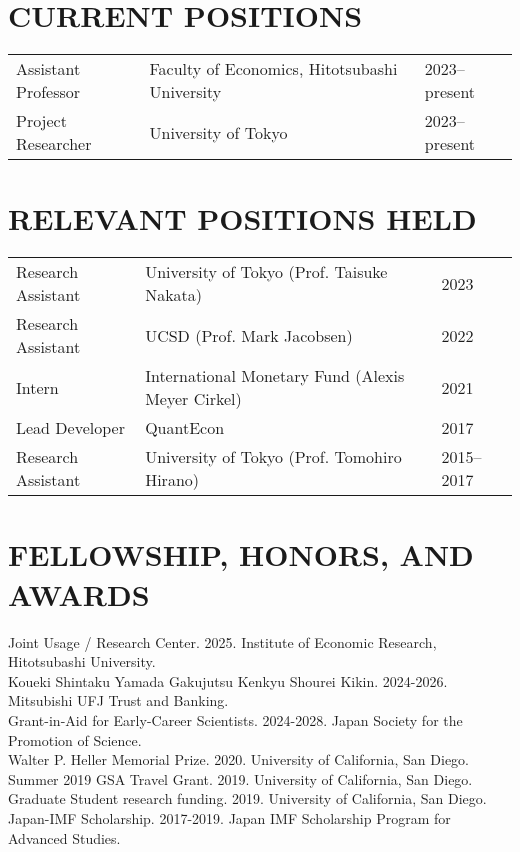 \documentclass[12pt]{article}
\begin{document}
\section*{CURRENT POSITIONS}
\begin{tabular}{@{}lll}
Assistant Professor &Faculty of Economics, Hitotsubashi University& 2023--present\\
Project Researcher &University of Tokyo& 2023--present
\end{tabular}

\section*{RELEVANT POSITIONS HELD}
\begin{tabular}{@{}lll}
Research Assistant &University of Tokyo (Prof. Taisuke Nakata)& 2023\\
Research Assistant &UCSD (Prof. Mark Jacobsen)& 2022\\
Intern &International Monetary Fund (Alexis Meyer Cirkel)& 2021\\
Lead Developer &QuantEcon& 2017\\
Research Assistant &University of Tokyo (Prof. Tomohiro Hirano)& 2015--2017
\end{tabular}

\section*{FELLOWSHIP, HONORS, AND AWARDS}
Joint Usage / Research Center. 2025. Institute of Economic Research, Hitotsubashi University.\\
Koueki Shintaku Yamada Gakujutsu Kenkyu Shourei Kikin. 2024-2026. Mitsubishi UFJ Trust and Banking.\\
Grant-in-Aid for Early-Career Scientists. 2024-2028. Japan Society for the Promotion of Science.\\
Walter P. Heller Memorial Prize. 2020. University of California, San Diego.\\
Summer 2019 GSA Travel Grant. 2019. University of California, San Diego.\\
Graduate Student research funding. 2019. University of California, San Diego.\\
Japan-IMF Scholarship. 2017-2019. Japan IMF Scholarship Program for Advanced Studies.
\end{document}
